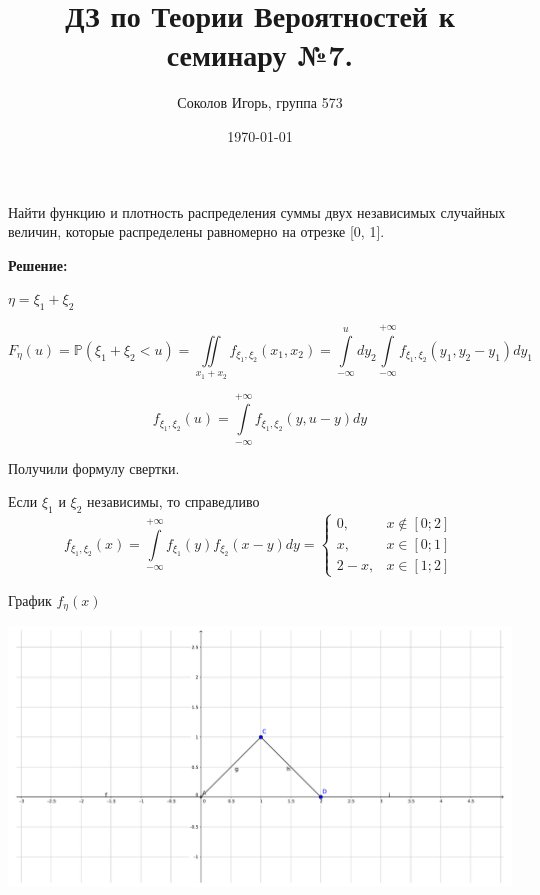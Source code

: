 \documentclass[a4paper,12pt]{article}
\author{Соколов Игорь, группа 573}
\title{ДЗ по Теории Вероятностей к семинару №7.}
\date{\today}
\newcommand{\bb}{\mathbb}
\begin{document}

\maketitle

\section{}

Найти функцию и плотность распределения суммы двух независимых случайных величин, которые распределены равномерно на отрезке [0, 1].

\vspace{\baselineskip}

\textbf{Решение:}

$\eta = \xi_1 + \xi_2$

\begin{equation}
F_{\eta}(u) = \bb P(\xi_1 +\xi_2 < u) = \iint\limits_{x_1 + x_2}f_{\xi_1,\xi_2}(x_1,x_2) = \int\limits_{-\infty}^{u}dy_2\int\limits_{-\infty}^{+\infty} f_{\xi_1, \xi_2}(y_1,y_2 - y_1)dy_1
\end{equation}

\begin{equation}
f_{\xi_1, \xi_2}(u) = \int\limits_{-\infty}^{+\infty} f_{\xi_1, \xi_2}(y, u -y)dy
\end{equation}

Получили формулу свертки.

Если $\xi_1$ и $\xi_2$ независимы, то справедливо
\begin{equation}
f_{\xi_1, \xi_2}(x) = \int\limits_{-\infty}^{+\infty} f_{\xi_1}(y) f_{\xi_2}(x-y)dy 
=
\begin{cases}
0,& x \notin[0;2]\\
x,& x \in[0;1]\\
2 - x,& x\in [1;2]
\end{cases}
\end{equation}

График $f_{\eta}(x)$

\includegraphics[width=\textwidth]{image1.pdf}
\end{document}
